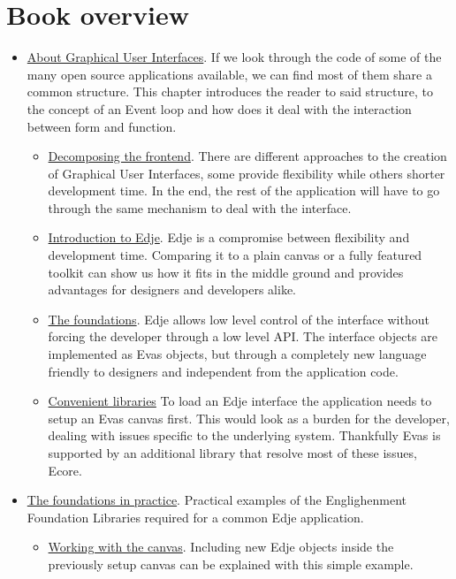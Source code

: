 \documentclass[12pt,a4paper,english]{book}
\begin{document}
\chapter{Book overview}
\begin{itemize}
\item {} 
\href{\#about-graphical-user-interfaces}{About Graphical User Interfaces}.
If we look through the code of some of the many open source applications
available, we can find most of them share a common structure. This chapter
introduces the reader to said structure, to the concept of an Event loop and
how does it deal with the interaction between form and function.
\begin{itemize}
\item {} 
\href{\#decomposing-the-frontend}{Decomposing the frontend}.
There are different approaches to the creation of Graphical User Interfaces,
some provide flexibility while others shorter development time. In the end, the
rest of the application will have to go through the same mechanism to deal
with the interface.

\item {} 
\href{\#introduction-to-edje}{Introduction to Edje}.
Edje is a compromise between flexibility and development time. Comparing it to
a plain canvas or a fully featured toolkit can show us how it fits in the
middle ground and provides advantages for designers and developers alike.

\item {} 
\href{\#the-foundations}{The foundations}.
Edje allows low level control of the interface without forcing the developer
through a low level API. The interface objects are implemented as Evas objects,
but through a completely new language friendly to designers and independent
from the application code.

\item {} 
\href{\#convenient-libraries}{Convenient libraries}
To load an Edje interface the application needs to setup an Evas canvas first.
This would look as a burden for the developer, dealing with issues specific to
the underlying system. Thankfully Evas is supported by an additional library
that resolve most of these issues, Ecore.

\end{itemize}

\item {} 
\href{\#the-foundations-in-practice}{The foundations in practice}.
Practical examples of the Englighenment Foundation Libraries required for a
common Edje application.
\begin{itemize}
\item {} 
\href{\#working-with-the-canvas}{Working with the canvas}.
Including new Edje objects inside the previously setup canvas can be explained
with this simple example.


\end{itemize}
\end{itemize}
\end{document}
